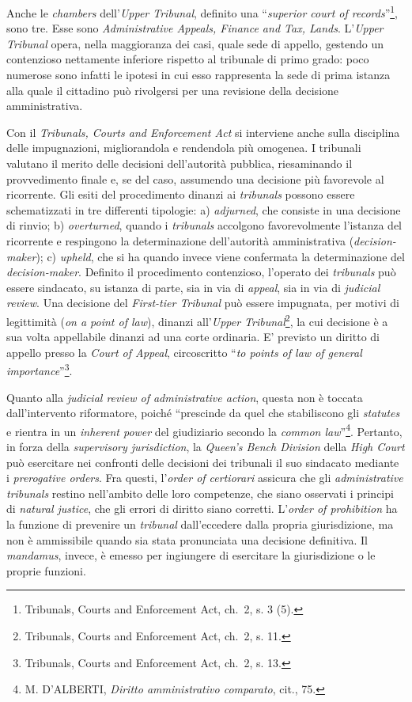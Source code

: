 \documentclass[12pt,it,a4paper,]{report}
\begin{document}
Anche le \emph{chambers} dell'\emph{Upper Tribunal}, definito una
``\emph{superior court of records}''\footnote{Tribunals, Courts and
  Enforcement Act, ch.~2, s. 3 (5).}, sono tre. Esse sono
\emph{Administrative Appeals, Finance and Tax, Lands}. L'\emph{Upper
Tribunal} opera, nella maggioranza dei casi, quale sede di appello,
gestendo un contenzioso nettamente inferiore rispetto al tribunale di
primo grado: poco numerose sono infatti le ipotesi in cui esso
rappresenta la sede di prima istanza alla quale il cittadino può
rivolgersi per una revisione della decisione amministrativa.

Con il \emph{Tribunals, Courts and Enforcement Act} si interviene anche
sulla disciplina delle impugnazioni, migliorandola e rendendola più
omogenea. I tribunali valutano il merito delle decisioni dell'autorità
pubblica, riesaminando il provvedimento finale e, se del caso, assumendo
una decisione più favorevole al ricorrente. Gli esiti del procedimento
dinanzi ai \emph{tribunals} possono essere schematizzati in tre
differenti tipologie: a) \emph{adjurned}, che consiste in una decisione
di rinvio; b) \emph{overturned}, quando i \emph{tribunals} accolgono
favorevolmente l'istanza del ricorrente e respingono la determinazione
dell'autorità amministrativa (\emph{decision-maker}); c) \emph{upheld},
che si ha quando invece viene confermata la determinazione del
\emph{decision-maker}. Definito il procedimento contenzioso, l'operato
dei \emph{tribunals} può essere sindacato, su istanza di parte, sia in
via di \emph{appeal}, sia in via di \emph{judicial review}. Una
decisione del \emph{First-tier Tribunal} può essere impugnata, per
motivi di legittimità (\emph{on a point of law}), dinanzi
all'\emph{Upper Tribunal}\footnote{Tribunals, Courts and Enforcement
  Act, ch.~2, s. 11.}, la cui decisione è a sua volta appellabile
dinanzi ad una corte ordinaria. E' previsto un diritto di appello presso
la \emph{Court of Appeal}, circoscritto ``\emph{to points of law of
general importance}''\footnote{Tribunals, Courts and Enforcement Act,
  ch.~2, s. 13.}.

Quanto alla \emph{judicial review of administrative action}, questa non
è toccata dall'intervento riformatore, poiché ``prescinde da quel che
stabiliscono gli \emph{statutes} e rientra in un \emph{inherent power}
del giudiziario secondo la \emph{common law}''\footnote{M. D'ALBERTI,
  \emph{Diritto amministrativo comparato}, cit., 75.}. Pertanto, in
forza della \emph{supervisory jurisdiction}, la \emph{Queen's Bench
Division} della \emph{High Court} può esercitare nei confronti delle
decisioni dei tribunali il suo sindacato mediante i \emph{prerogative
orders}. Fra questi, l'\emph{order of certiorari} assicura che gli
\emph{administrative tribunals} restino nell'ambito delle loro
competenze, che siano osservati i principi di \emph{natural justice},
che gli errori di diritto siano corretti. L'\emph{order of prohibition}
ha la funzione di prevenire un \emph{tribunal} dall'eccedere dalla
propria giurisdizione, ma non è ammissibile quando sia stata pronunciata
una decisione definitiva. Il \emph{mandamus}, invece, è emesso per
ingiungere di esercitare la giurisdizione o le proprie funzioni.
\end{document}
